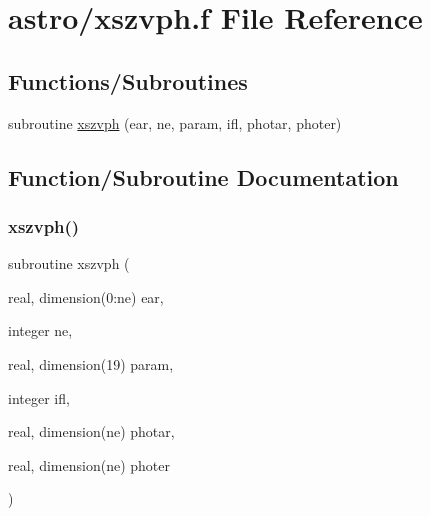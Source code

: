 \hypertarget{xszvph_8f}{}\section{astro/xszvph.f File Reference}
\label{xszvph_8f}
\subsection*{Functions/\+Subroutines}
\begin{DoxyCompactItemize}
\item 
subroutine \hyperlink{xszvph_8f_a9188074958ba20e42f0ebb2bd5589b97}{xszvph} (ear, ne, param, ifl, photar, photer)
\end{DoxyCompactItemize}


\subsection{Function/\+Subroutine Documentation}
\mbox{\label{xszvph_8f_a9188074958ba20e42f0ebb2bd5589b97}} 
\subsubsection{\texorpdfstring{xszvph()}{xszvph()}}
{\footnotesize\ttfamily subroutine xszvph (\begin{DoxyParamCaption}\item[{real, dimension(0\+:ne)}]{ear,  }\item[{integer}]{ne,  }\item[{real, dimension(19)}]{param,  }\item[{integer}]{ifl,  }\item[{real, dimension(ne)}]{photar,  }\item[{real, dimension(ne)}]{photer }\end{DoxyParamCaption})}


